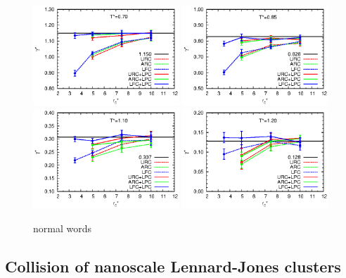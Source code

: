\documentclass[aps,pre,preprint]{revtex4}
\begin{document}
\begin{figure}
  \centering
  \includegraphics[width=0.49\textwidth]{fig/converge/tension.t0.70.eps} 
  \includegraphics[width=0.49\textwidth]{fig/converge/tension.t0.85.eps} 
  \includegraphics[width=0.49\textwidth]{fig/converge/tension.t1.10.eps} 
  \includegraphics[width=0.49\textwidth]{fig/converge/tension.t1.20.eps} 
  \caption{normal words}
  \label{fig:tmp6}
\end{figure}


\subsection{Collision of nanoscale Lennard-Jones clusters}
\label{sec:tmp2.2}
\end{document}
